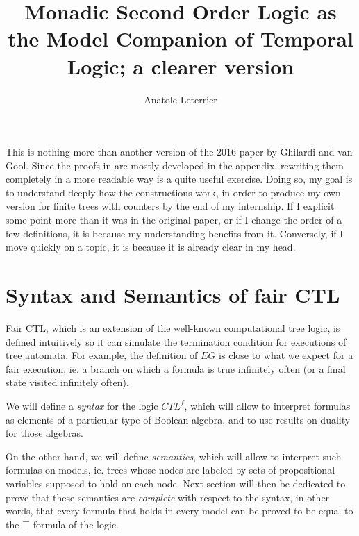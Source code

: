 \documentclass[11pt]{article}
\title{Monadic Second Order Logic as the Model Companion of Temporal Logic; a clearer version}
\author{Anatole Leterrier}
\begin{document}
\maketitle

This is nothing more than another version of the 2016 paper by Ghilardi and van Gool. Since the proofs in \cite{GhivG16} are mostly developed in the appendix, rewriting them completely in a more readable way is a quite useful exercise. Doing so, my goal is to understand deeply how the constructions work, in order to produce my own version for finite trees with counters by the end of my internship. If I explicit some point more than it was in the original paper, or if I change the order of a few definitions, it is because my understanding benefits from it. Conversely, if I move quickly on a topic, it is because it is already clear in my head.
\section{Syntax and Semantics of fair CTL}\label{sec:synt_sem}
Fair CTL, which is an extension of the well-known computational tree logic, is defined intuitively so it can simulate the termination condition for executions of tree automata. For example, the definition of $EG$ is close to what we expect for a fair execution, ie. a branch on which a formula is true infinitely often (or a final state visited infinitely often). 

We will define a \emph{syntax} for the logic $CTL^{f}$, which will allow to interpret formulas as elements of a particular type of Boolean algebra, and to use results on duality for those algebras. 

On the other hand, we will define \emph{semantics}, which will allow to interpret such formulas on models, ie. trees whose nodes are labeled by sets of propositional variables supposed to hold on each node. Next section will then be dedicated to prove that these semantics are \emph{complete} with respect to the syntax, in other words, that every formula that holds in every model can be proved to be equal to the $\top$ formula of the logic.
\end{document}
